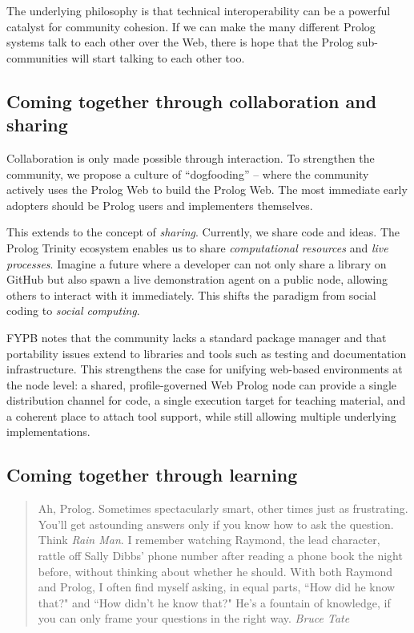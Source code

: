 The underlying philosophy is that technical interoperability can be a powerful catalyst for community cohesion. If we can make the many different Prolog systems talk to each other over the Web, there is hope that the Prolog sub-communities will start talking to each other too.

\subsection{Coming together through collaboration and sharing}

Collaboration is only made possible through interaction. To strengthen the community, we propose a culture of ``dogfooding'' -- where the community actively uses the Prolog Web to build the Prolog Web. The most immediate early adopters should be Prolog users and implementers themselves.

This extends to the concept of \textit{sharing}. Currently, we share code and ideas. The Prolog Trinity ecosystem enables us to share \textit{computational resources} and \textit{live processes}. Imagine a future where a developer can not only share a library on GitHub but also spawn a live demonstration agent on a public node, allowing others to interact with it immediately. This shifts the paradigm from social coding to \textit{social computing}.

FYPB notes that the community lacks a standard package manager and that portability issues extend to libraries and tools such as testing and documentation infrastructure. This strengthens the case for unifying web-based environments at the node level: a shared, profile-governed Web Prolog node can provide a single distribution channel for code, a single execution target for teaching material, and a coherent place to attach tool support, while still allowing multiple underlying implementations.


\subsection{Coming together through learning}

\begin{quotation}
\noindent Ah, Prolog. Sometimes spectacularly smart, other times just as frustrating. You'll get astounding answers only if you know how to ask the question. Think \textit{Rain Man}. I remember watching Raymond, the lead character, rattle off Sally Dibbs' phone number after reading a phone book the night before, without thinking about whether he should. With both Raymond and Prolog, I often find myself asking, in equal parts, ``How did he know that?" and ``How didn't he know that?" He's a fountain of knowledge, if you can only frame your questions in the right way.
\vspace{-0.3cm}
\flushright\textit{Bruce Tate}
\vspace{0.5cm}
\end{quotation}


